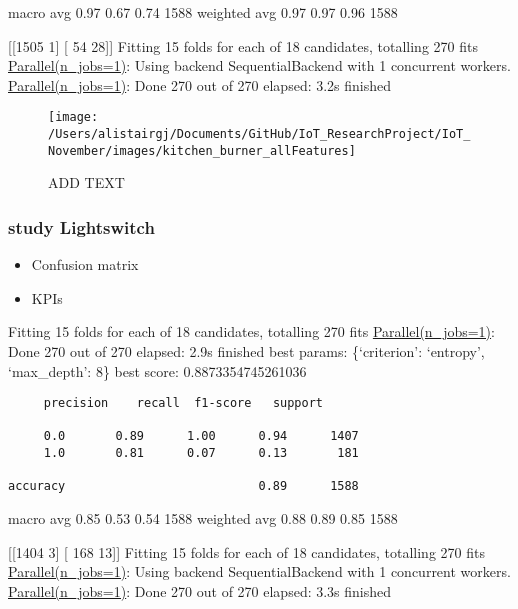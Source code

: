 \documentclass[11pt,]{article}
\providecommand{\tightlist}{%
  \setlength{\itemsep}{0pt}\setlength{\parskip}{0pt}}
\begin{document}
macro avg 0.97 0.67 0.74 1588 weighted avg 0.97 0.97 0.96 1588

{[}{[}1505 1{]} {[} 54 28{]}{]} Fitting 15 folds for each of 18
candidates, totalling 270 fits
\href{Done\%20270\%20out\%20of\%20270\%20\%7C\%20elapsed:\%202.1s\%20finished}{Parallel(n\_jobs=1)}:
Using backend SequentialBackend with 1 concurrent workers.
\href{Done\%20270\%20out\%20of\%20270\%20\%7C\%20elapsed:\%202.1s\%20finished}{Parallel(n\_jobs=1)}:
Done 270 out of 270 \textbar{} elapsed: 3.2s finished

\begin{figure}[H]

{\centering \texttt{[image: /Users/alistairgj/Documents/GitHub/IoT\_ResearchProject/IoT\_November/images/kitchen\_burner\_allFeatures]} 

}

\caption{ADD TEXT}\label{fig:unnamed-chunk-10}
\end{figure}

\pagebreak

\hypertarget{study-lightswitch}{%
\subsubsection{study Lightswitch}\label{study-lightswitch}}

\begin{itemize}
\tightlist
\item
  Confusion matrix
\item
  KPIs
\end{itemize}

Fitting 15 folds for each of 18 candidates, totalling 270 fits
\href{Done\%20270\%20out\%20of\%20270\%20\%7C\%20elapsed:\%202.1s\%20finished}{Parallel(n\_jobs=1)}:
Done 270 out of 270 \textbar{} elapsed: 2.9s finished best params:
\{`criterion': `entropy', `max\_depth': 8\} best score:
0.8873354745261036

\begin{verbatim}
     precision    recall  f1-score   support

     0.0       0.89      1.00      0.94      1407
     1.0       0.81      0.07      0.13       181

accuracy                           0.89      1588
\end{verbatim}

macro avg 0.85 0.53 0.54 1588 weighted avg 0.88 0.89 0.85 1588

{[}{[}1404 3{]} {[} 168 13{]}{]} Fitting 15 folds for each of 18
candidates, totalling 270 fits
\href{Done\%20270\%20out\%20of\%20270\%20\%7C\%20elapsed:\%202.1s\%20finished}{Parallel(n\_jobs=1)}:
Using backend SequentialBackend with 1 concurrent workers.
\href{Done\%20270\%20out\%20of\%20270\%20\%7C\%20elapsed:\%202.1s\%20finished}{Parallel(n\_jobs=1)}:
Done 270 out of 270 \textbar{} elapsed: 3.3s finished
\end{document}

